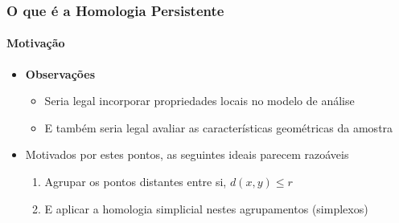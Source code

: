 \documentclass[11pt]{beamer}
\theoremstyle{remark}
\theoremstyle{definition}
\theoremstyle{plain}
\begin{document}
    \begin{frame}
        \frametitle{O que é a Homologia Persistente}
        \framesubtitle{Motivação}

        \begin{itemize}

            \item
                \textbf{Observações} \\[0.4cm]
                \begin{itemize}
                    \item
                        Seria legal incorporar propriedades locais
                        no modelo de análise\\[0.2cm]

                    \item
                        E também seria legal avaliar as características
                        geométricas da amostra\\[0.4cm]

                \end{itemize}

            \item
                Motivados por estes pontos,
                as seguintes ideais parecem razoáveis \\[0.4cm]
                \begin{enumerate}
                    \item
                        Agrupar os pontos distantes entre si, $d(x,y) \leq r$\\[0.2cm]

                    \item
                        E aplicar a homologia simplicial nestes agrupamentos (simplexos)
                \end{enumerate}
        \end{itemize}


    \end{frame}
\end{document}

